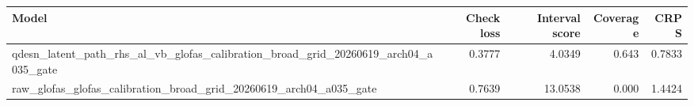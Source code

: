 \begin{tabular}{lrrrr}
\toprule
Model & Check loss & Interval score & Coverage & CRPS \\
\midrule
qdesn_latent_path_rhs_al_vb_glofas_calibration_broad_grid_20260619_arch04_a035_gate & 0.3777 & 4.0349 & 0.643 & 0.7833 \\
raw_glofas_glofas_calibration_broad_grid_20260619_arch04_a035_gate & 0.7639 & 13.0538 & 0.000 & 1.4424 \\
\bottomrule
\end{tabular}
